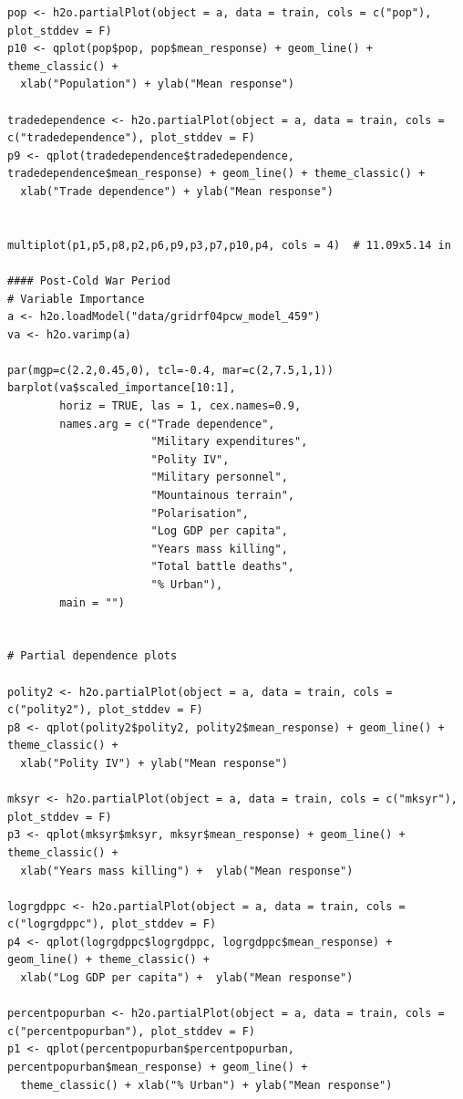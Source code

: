 \begin{verbatim}
pop <- h2o.partialPlot(object = a, data = train, cols = c("pop"), plot_stddev = F)
p10 <- qplot(pop$pop, pop$mean_response) + geom_line() + theme_classic() +
  xlab("Population") + ylab("Mean response")

tradedependence <- h2o.partialPlot(object = a, data = train, cols = c("tradedependence"), plot_stddev = F)
p9 <- qplot(tradedependence$tradedependence, tradedependence$mean_response) + geom_line() + theme_classic() +
  xlab("Trade dependence") + ylab("Mean response")


multiplot(p1,p5,p8,p2,p6,p9,p3,p7,p10,p4, cols = 4)  # 11.09x5.14 in

#### Post-Cold War Period
# Variable Importance
a <- h2o.loadModel("data/gridrf04pcw_model_459")
va <- h2o.varimp(a)

par(mgp=c(2.2,0.45,0), tcl=-0.4, mar=c(2,7.5,1,1))
barplot(va$scaled_importance[10:1],
        horiz = TRUE, las = 1, cex.names=0.9,
        names.arg = c("Trade dependence",
                      "Military expenditures",
                      "Polity IV",
                      "Military personnel", 
                      "Mountainous terrain",
                      "Polarisation",
                      "Log GDP per capita",
                      "Years mass killing",
                      "Total battle deaths",
                      "% Urban"),
        main = "")


# Partial dependence plots

polity2 <- h2o.partialPlot(object = a, data = train, cols = c("polity2"), plot_stddev = F)
p8 <- qplot(polity2$polity2, polity2$mean_response) + geom_line() + theme_classic() +
  xlab("Polity IV") + ylab("Mean response")

mksyr <- h2o.partialPlot(object = a, data = train, cols = c("mksyr"), plot_stddev = F)
p3 <- qplot(mksyr$mksyr, mksyr$mean_response) + geom_line() + theme_classic() +
  xlab("Years mass killing") +  ylab("Mean response")

logrgdppc <- h2o.partialPlot(object = a, data = train, cols = c("logrgdppc"), plot_stddev = F)
p4 <- qplot(logrgdppc$logrgdppc, logrgdppc$mean_response) + geom_line() + theme_classic() +
  xlab("Log GDP per capita") +  ylab("Mean response")

percentpopurban <- h2o.partialPlot(object = a, data = train, cols = c("percentpopurban"), plot_stddev = F)
p1 <- qplot(percentpopurban$percentpopurban, percentpopurban$mean_response) + geom_line() +
  theme_classic() + xlab("% Urban") + ylab("Mean response")


\end{verbatim}
